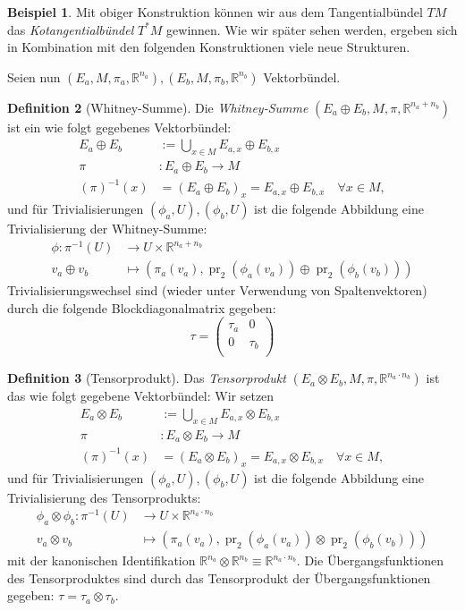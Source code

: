 \documentclass[a4paper]{scrbook}
\numberwithin{equation}{chapter}
\DeclareMathOperator{\pr}{pr}
\newcommand{\R}{\mathbb{R}}
\theoremstyle{definition}
\newtheorem{defn}{Definition}[section]
\newtheorem{bsp}[defn]{Beispiel}
\begin{document}
		\begin{bsp}
			Mit obiger Konstruktion können wir aus dem Tangentialbündel $TM$ das \emph{Kotangentialbündel} $T^*M$ gewinnen. Wie wir später sehen werden, ergeben sich in Kombination mit den folgenden Konstruktionen viele neue Strukturen.
		\end{bsp}
		
		Seien nun $(E_a,M,\pi_a,\R^{n_a}),(E_b,M,\pi_b,\R^{n_b})$ Vektorbündel.
		\begin{defn}[Whitney-Summe]
			Die \emph{Whitney-Summe} $(E_a\oplus E_b ,M,\pi,\R^{n_a+n_b})$ ist ein wie folgt gegebenes Vektorbündel:
			\begin{align*}
				E_a\oplus E_b&:=\bigcup_{x\in M}E_{a,x}\oplus E_{b,x}\\
				\pi&\colon E_a\oplus E_b\rightarrow M\\
				(\pi)^{-1}(x)&=(E_a\oplus E_b)_x=E_{a,x}\oplus E_{b,x}\quad \forall x\in M,
			\end{align*}
			und für Trivialisierungen $(\phi_a,U),(\phi_b,U)$ ist die folgende Abbildung eine Trivialisierung der Whitney-Summe:
			\begin{align*}
				\phi\colon\pi^{-1}(U)&\rightarrow U\times \R^{n_a+n_b}\\
				v_a\oplus v_b&\mapsto (\pi_a(v_a), \pr_2(\phi_a(v_a))\oplus\pr_2(\phi_b(v_b)))
			\end{align*}
			Trivialisierungswechsel sind (wieder unter Verwendung von Spaltenvektoren) durch die folgende Blockdiagonalmatrix gegeben: 
			\begin{equation}
				\tau=\left(\begin{array}{cc}\tau_a&0\\0&\tau_b\\ \end{array}\right)
			\end{equation}
		\end{defn}
		\begin{defn}[Tensorprodukt]
			Das \emph{Tensorprodukt} $(E_a\otimes E_b, M, \pi, \R^{n_a\cdot n_b})$ ist das wie folgt gegebene Vektorbündel: Wir setzen
			\begin{align*}
				E_a\otimes E_b&:=\bigcup_{x\in M}E_{a,x}\otimes E_{b,x}\\
				\pi&\colon E_a\otimes E_b\rightarrow M\\
				(\pi)^{-1}(x)&=(E_a\otimes E_b)_x=E_{a,x}\otimes E_{b,x}\quad \forall x\in M,
			\end{align*}
			und für Trivialisierungen $(\phi_a,U),(\phi_b,U)$ ist die folgende Abbildung eine Trivialisierung des Tensorprodukts:
			\begin{align*}
				\phi_a\otimes\phi_b\colon\pi^{-1}(U)&\rightarrow U\times \R^{n_a\cdot n_b}\\
				v_a\otimes v_b&\mapsto (\pi_a(v_a), \pr_2(\phi_a(v_a))\otimes\pr_2(\phi_b(v_b)))
			\end{align*}
			mit der kanonischen Identifikation  $\R^{n_a} \otimes\R^{n_b} \equiv \R^{n_a \cdot n_b}$.
			Die Übergangsfunktionen des Tensorproduktes sind durch das Tensorprodukt der Übergangsfunktionen gegeben: $\tau=\tau_a\otimes\tau_b$.
		\end{defn}
		
\end{document}
